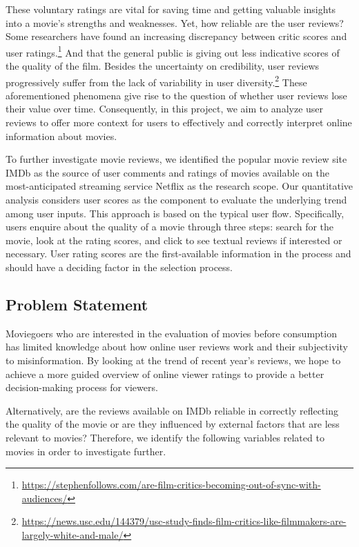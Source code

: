 \documentclass[
]{article}
\begin{document}
These voluntary ratings are vital for saving time and getting valuable
insights into a movie's strengths and weaknesses. Yet, how reliable are
the user reviews? Some researchers have found an increasing discrepancy
between critic scores and user ratings.\footnote{\url{https://stephenfollows.com/are-film-critics-becoming-out-of-sync-with-audiences/}}
And that the general public is giving out less indicative scores of the
quality of the film. Besides the uncertainty on credibility, user
reviews progressively suffer from the lack of variability in user
diversity.\footnote{\url{https://news.usc.edu/144379/usc-study-finds-film-critics-like-filmmakers-are-largely-white-and-male/}}
These aforementioned phenomena give rise to the question of whether user
reviews lose their value over time. Consequently, in this project, we
aim to analyze user reviews to offer more context for users to
effectively and correctly interpret online information about movies.

To further investigate movie reviews, we identified the popular movie
review site IMDb as the source of user comments and ratings of movies
available on the most-anticipated streaming service Netflix as the
research scope. Our quantitative analysis considers user scores as the
component to evaluate the underlying trend among user inputs. This
approach is based on the typical user flow. Specifically, users enquire
about the quality of a movie through three steps: search for the movie,
look at the rating scores, and click to see textual reviews if
interested or necessary. User rating scores are the first-available
information in the process and should have a deciding factor in the
selection process.

\hypertarget{problem-statement}{%
\subsection{Problem Statement}\label{problem-statement}}

Moviegoers who are interested in the evaluation of movies before
consumption has limited knowledge about how online user reviews work and
their subjectivity to misinformation. By looking at the trend of recent
year's reviews, we hope to achieve a more guided overview of online
viewer ratings to provide a better decision-making process for viewers.

Alternatively, are the reviews available on IMDb reliable in correctly
reflecting the quality of the movie or are they influenced by external
factors that are less relevant to movies? Therefore, we identify the
following variables related to movies in order to investigate further.
\end{document}
